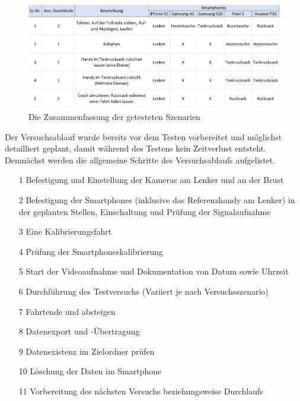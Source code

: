 \begin{figure}[H]
	\centering
	\includegraphics[width=\linewidth]{Bilder/TestSzenarienZusammenfassung.png}
	\caption{Die Zusammenfassung der getesteten Szenarien}
	\label{fig:TestSzenarienZusammenfassung}
\end{figure}
Der Versuchsablauf wurde bereits vor dem Testen vorbereitet und möglichst detailliert geplant, damit während des Testens kein Zeitverlust entsteht.
Demnächst werden die allgemeine Schritte des Versuchsablaufs aufgelistet.

\begin{itemize}
	\item[1] Befestigung und Einstellung der Kameras am Lenker und an der Brust
	\item[2] Befestigung der Smartphones (inklusive das Referenzhandy am Lenker) in der geplanten Stellen, Einschaltung und Prüfung der Signalaufnahme
	\item[3] Eine Kalibrierungsfahrt
	\item[4] Prüfung der Smartphoneskalibrierung
	\item[5] Start der Videoaufnahme und Dokumentation von Datum sowie Uhrzeit
	\item[6] Durchführung des Testversuchs (Variiert je nach Versuchsszenario)
	\item[7] Fahrtende und absteigen
	\item[8] Datenexport und -Übertragung
	\item[9] Datenexistenz im Zielordner prüfen
	\item[10] Löschung der Daten im Smartphone
	\item[11] Vorbereitung des nächsten Versuchs beziehungsweise Durchlaufs
\end{itemize}

